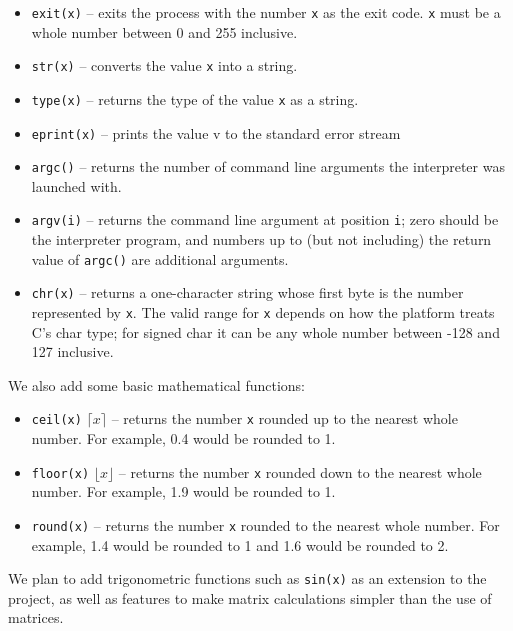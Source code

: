 \begin{itemize}
 \item \verb+exit(x)+ – exits the process with the number \verb+x+ as the exit code. \verb+x+ must be a whole number between 0 and 255 inclusive.
 \item \verb+str(x)+ – converts the value \verb+x+ into a string.
 \item \verb+type(x)+ – returns the type of the value \verb+x+ as a string.
 \item \verb+eprint(x)+ – prints the value v to the standard error stream
 \item \verb+argc()+ – returns the number of command line arguments the interpreter was launched with.
 \item \verb+argv(i)+ – returns the command line argument at position \verb+i+; zero should be the interpreter program, and numbers up to (but not including) the return value of \verb+argc()+ are additional arguments.
 \item \verb+chr(x)+ – returns a one-character string whose first byte is the number represented by \verb+x+. The valid range for \verb+x+ depends on how the platform treats C's char type; for signed char it can be any whole number between -128 and 127 inclusive.
\end{itemize}

We also add some basic mathematical functions:

\begin{itemize}
 \item \verb+ceil(x)+ \( \lceil x \rceil \) – returns the number \verb+x+ rounded up to the nearest whole number. For example, 0.4 would be rounded to 1. 
 \item \verb+floor(x)+ \( \lfloor x \rfloor \) – returns the number \verb+x+ rounded down to the nearest whole number. For example, 1.9 would be rounded to 1.
 \item \verb+round(x)+ – returns the number \verb+x+ rounded to the nearest whole number. For example, 1.4 would be rounded to 1 and 1.6 would be rounded to 2.  
\end{itemize}

We plan to add trigonometric functions such as \verb+sin(x)+ as an extension to the project, as well as features to make matrix calculations simpler than the use of matrices. 

